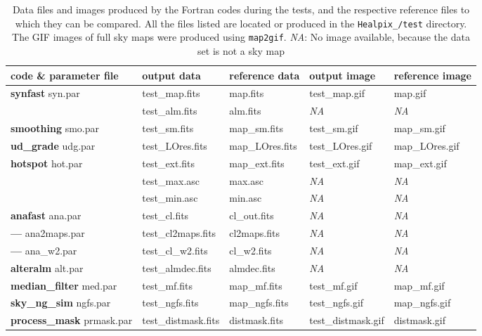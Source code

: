 \documentclass[12pt,twoside]{article}
\begin{document}
\begin{table}[!h]
\footnotesize
\begin{tabular}{lllll}
\hline
{\bf code}    \& parameter file & output data 	& reference data  & output image    & reference image \\
\hline
{\bf synfast}  syn.par & test\_map.fits 	& map.fits 	  & test\_map.gif   & map.gif \\
                       & test\_alm.fits 	& alm.fits 	  & {\em NA}        & {\em NA} \\
{\bf smoothing} smo.par & test\_sm.fits		& map\_sm.fits 	  & test\_sm.gif    & map\_sm.gif \\
{\bf ud\_grade} udg.par & test\_LOres.fits	& map\_LOres.fits & test\_LOres.gif & map\_LOres.gif \\
{\bf hotspot}  hot.par & test\_ext.fits	  	& map\_ext.fits   & test\_ext.gif   & map\_ext.gif \\
		       & test\_max.asc		& max.asc 	  & {\em NA} 	    & {\em NA} \\
		       & test\_min.asc		& min.asc 	  & {\em NA} 	    & {\em NA} \\
{\bf anafast}  ana.par & test\_cl.fits		& cl\_out.fits 	  & {\em NA}	    & {\em NA} \\
{\bf ---}  ana2maps.par & test\_cl2maps.fits 	& cl2maps.fits 	  & {\em NA}	    & {\em NA} \\
{\bf ---}  ana\_w2.par & test\_cl\_w2.fits 	& cl\_w2.fits 	  & {\em NA}	    & {\em NA} \\
{\bf alteralm}  alt.par & test\_almdec.fits	& almdec.fits 	  & {\em NA}	    & {\em NA} \\
{\bf median\_filter}  med.par & test\_mf.fits	& map\_mf.fits	  & test\_mf.gif    & map\_mf.gif \\
{\bf sky\_ng\_sim}   ngfs.par & test\_ngfs.fits	& map\_ngfs.fits  & test\_ngfs.gif  & map\_ngfs.gif \\
{\bf process\_mask} prmask.par & test\_distmask.fits	& distmask.fits	& test\_distmask.gif & distmask.gif \\
\hline
\end{tabular}
\caption[Data files]{
\label{page:f90_tests}
\label{tab:f90_tests} %
\footnotesize
Data files and images produced by the Fortran codes during the tests,
and the respective reference files to which they can be compared. All the files listed
are located or produced in the \texttt{Healpix\_\hpxversion/test} directory. The GIF images of full sky maps were
produced using \texttt{map2gif}. {\em NA}: No image available, because the data set
is not a sky map}
\normalsize
\end{table}
\end{document}
